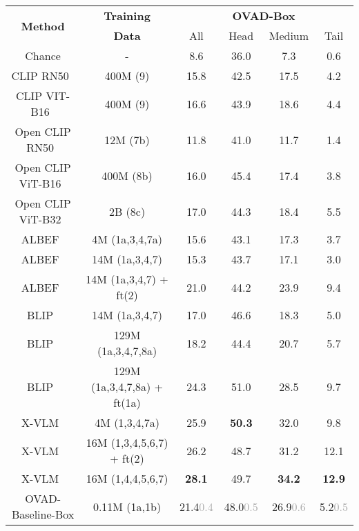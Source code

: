 \documentclass[10pt,twocolumn,letterpaper]{article}
\newcommand{\modelnamenospace}{OVAD-Baseline}
\newcommand{\taskname}{OVAD}
\newcommand{\std}[1]{\textcolor{darkgray}{\tiny{#1}}}
\begin{document}
 \begin{table*}[t]
\begin{minipage}[lt]{0.6\textwidth}{\scriptsize
\centering 
\begin{tabular}{ |c|@{\hspace{0.3mm}}c@{\hspace{0.3mm}}|c|c@{\hspace{0.5mm}}c@{\hspace{0.5mm}}c|} 
    \hline 
\multirow{2}{*}{\textbf{Method}} & \textbf{Training} & \multicolumn{4}{|c|}{ \textbf{\taskname-Box} } \\
    & \textbf{Data} & All & Head & Medium & Tail \\ 
    \hline
    Chance & - & 8.6 & 36.0 & 7.3 & 0.6 \\
    \hline
    CLIP RN50~\cite{clip}  & 400M (9) & 15.8 & 42.5 & 17.5 & 4.2 \\
    CLIP VIT-B16~\cite{clip}  & 400M (9) & 16.6 & 43.9 & 18.6 & 4.4 \\
    \hline
    Open CLIP RN50~\cite{open_clip}  & 12M (7b) & 11.8 & 41.0 & 11.7 & 1.4 \\
Open CLIP ViT-B16~\cite{open_clip}  & 400M (8b) & 16.0 & 45.4 & 17.4 & 3.8 \\
    Open CLIP ViT-B32~\cite{open_clip}  & 2B (8c) & 17.0 & 44.3 & 18.4 & 5.5 \\
    \hline
    ALBEF~\cite{albef}  & 4M (1a,3,4,7a) & 15.6 & 43.1 & 17.3 & 3.7 \\
    ALBEF~\cite{albef}  & 14M (1a,3,4,7) & 15.3 & 43.7 & 17.1 & 3.0 \\
ALBEF~\cite{albef}  & 14M (1a,3,4,7) + ft(2) & 21.0 & 44.2 & 23.9 & 9.4 \\
    \hline
    BLIP~\cite{blip}  & 14M (1a,3,4,7) & 17.0 & 46.6 & 18.3 & 5.0 \\
    BLIP~\cite{blip}  & 129M (1a,3,4,7,8a) & 18.2 & 44.4 & 20.7 & 5.7 \\
BLIP~\cite{blip}  & 129M (1a,3,4,7,8a) + ft(1a) & 24.3 & 51.0 & 28.5 & 9.7 \\
    \hline
X-VLM~\cite{xvlm}  & 4M (1,3,4,7a) & 25.9 & \textbf{50.3} & 32.0 & 9.8 \\
    X-VLM~\cite{xvlm}  & 16M (1,3,4,5,6,7) + ft(2) & 26.2 & 48.7 & 31.2 & 12.1 \\
X-VLM~\cite{xvlm}  & 16M (1,4,4,5,6,7) & \textbf{28.1} & 49.7 & \textbf{34.2} & \textbf{12.9} \\
    \hline
\modelnamenospace{}-Box  & 0.11M (1a,1b) & 21.4\std{0.4} & 48.0\std{0.5} & 26.9\std{0.6} & 5.2\std{0.5} \\
    

\end{tabular}}
\end{minipage}
\end{table*}
\end{document}
